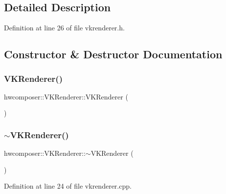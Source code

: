 \subsection{Detailed Description}


Definition at line 26 of file vkrenderer.\+h.



\subsection{Constructor \& Destructor Documentation}
\mbox{\label{classhwcomposer_1_1VKRenderer_acd726cc3da3bbabca0319084b8fb3adb}} 
\subsubsection{\texorpdfstring{V\+K\+Renderer()}{VKRenderer()}}
{\footnotesize\ttfamily hwcomposer\+::\+V\+K\+Renderer\+::\+V\+K\+Renderer (\begin{DoxyParamCaption}{ }\end{DoxyParamCaption})\hspace{0.3cm}{\ttfamily [default]}}

\mbox{\label{classhwcomposer_1_1VKRenderer_aa9c49647acea66ac3dce97db89573e3a}} 
\subsubsection{\texorpdfstring{$\sim$\+V\+K\+Renderer()}{~VKRenderer()}}
{\footnotesize\ttfamily hwcomposer\+::\+V\+K\+Renderer\+::$\sim$\+V\+K\+Renderer (\begin{DoxyParamCaption}{ }\end{DoxyParamCaption})}



Definition at line 24 of file vkrenderer.\+cpp.


\begin{DoxyCode}{0}
\end{DoxyCode}


